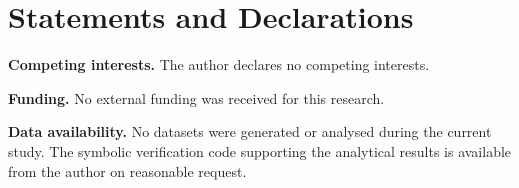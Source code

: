 \documentclass[12pt,a4paper]{article}
\theoremstyle{definition}
\begin{document}
\section*{Statements and Declarations}

\noindent\textbf{Competing interests.} The author declares no competing interests.

\noindent\textbf{Funding.} No external funding was received for this research.

\noindent\textbf{Data availability.} No datasets were generated or analysed during the current study. The symbolic verification code supporting the analytical results is available from the author on reasonable request.




\end{document}

